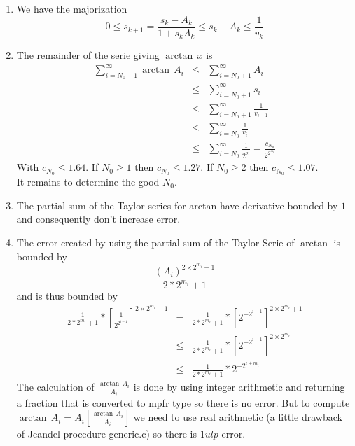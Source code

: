 \documentclass[12pt]{amsart}
\begin{document}
\begin{enumerate}
\item We have the majorization
\begin{equation*}
0\leq s_{k+1}=\frac{s_k-A_k}{1+s_kA_k}\leq s_k-A_k\leq \frac{1}{v_k}
\end{equation*}
\item The remainder of the serie giving $\arctan\,x$ is
\begin{equation*}
\begin{array}{rcl}
\sum_{i=N_0+1}^{\infty}\arctan\,A_i
&\leq &\sum_{i=N_0+1}^{\infty}A_i\\
&\leq &\sum_{i=N_0+1}^{\infty}s_i\\
&\leq &\sum_{i=N_0+1}^{\infty}\frac{1}{v_{i-1}}\\
&\leq &\sum_{i=N_0}^{\infty}\frac{1}{v_{i}}\\
&\leq &\sum_{i=N_0}^{\infty}\frac{1}{2^{2^i}}=\frac{c_{N_0}}{2^{2^{N_0}}}
\end{array}
\end{equation*}
With $c_{N_0}\leq 1.64$. If $N_0\geq 1$ then $c_{N_0}\leq 1.27$. If $N_0\geq 2$ then $c_{N_0}\leq 1.07$.\\
It remains to determine the good $N_0$.
\item The partial sum of the Taylor series for arctan have derivative bounded by $1$ and consequently don't increase error.
\item The error created by using the partial sum of the Taylor Serie of $\arctan$ is bounded by
\begin{equation*}
\frac{(A_i)^{2\times 2^{m_i}+1}}{2*2^{m_i}+1}
\end{equation*}
and is thus bounded by
\begin{equation*}
\begin{array}{rcl}
\frac{1}{2*2^{m_i}+1}*[\frac{1}{2^{2^{i-1}}}]^{2\times 2^{m_i}+1}
&=&\frac{1}{2*2^{m_i}+1}*[2^{-2^{i-1}}]^{2\times 2^{m_i}+1}\\
&\leq &\frac{1}{2*2^{m_i}+1}*[2^{-2^{i-1}}]^{2\times 2^{m_i}}\\
&\leq &\frac{1}{2*2^{m_i}+1}*2^{-2^{i+m_i}}
\end{array}
\end{equation*}
The calculation of $\frac{\arctan\,A_i}{A_i}$ is done by using integer arithmetic and returning a fraction that is converted to mpfr type so there is no error. But to compute $\arctan\,A_i=A_i[\frac{\arctan\,A_i}{A_i}]$ we need to use real arithmetic (a little drawback of Jeandel procedure generic.c) so there is $1 ulp$ error.\\

\end{enumerate}
\end{document}
